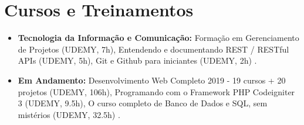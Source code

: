 \documentclass[11pt,a4paper,sans]{moderncv}        %
\begin{document}
\section{Cursos e Treinamentos}

\vspace{6pt}

\begin{itemize}

\item \textbf{Tecnologia da Informação e Comunicação:} Formação em Gerenciamento de Projetos (UDEMY, 7h), Entendendo e documentando REST / RESTful APIs (UDEMY, 5h), Git e Github para iniciantes (UDEMY, 2h) .

\vspace{6pt}

\item \textbf{Em Andamento:} Desenvolvimento Web Completo 2019 - 19 cursos + 20 projetos (UDEMY, 106h), Programando com o Framework PHP Codeigniter 3 (UDEMY, 9.5h), O curso completo de Banco de Dados e SQL, sem mistérios (UDEMY, 32.5h) .


\vspace{6pt}



\end{itemize}






\end{document}
